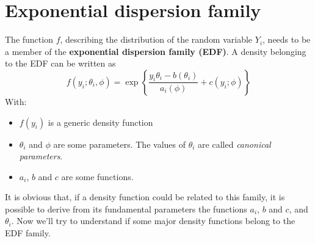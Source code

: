  \section{Exponential dispersion family}
    The function $f$, describing the distribution of the random variable $Y_i$, needs to be a member of the \textbf{exponential dispersion family (EDF)}. A density belonging to the EDF can be written as
    $$f(y_i;\theta_i,\phi)=\exp\left\{\frac{y_i\theta_i-b(\theta_i)}{a_i(\phi)}+c(y_i;\phi)\right\}$$
    With:
    \begin{itemize}
      \item $f(y_i)$ is a generic density function 
      \item $\theta_i$ and $\phi$ are some parameters. The values of $\theta_i$ are called \textit{canonical parameters}.
      \item $a_i$, $b$ and $c$ are some functions.
    \end{itemize}
    
	It is obvious that, if a density function could be related to this family, it is possible to  derive from its fundamental parameters the functions $a_i$, $b$ and $c$, and $\theta_i$. Now we'll try to understand if some major density functions belong to the EDF family.

